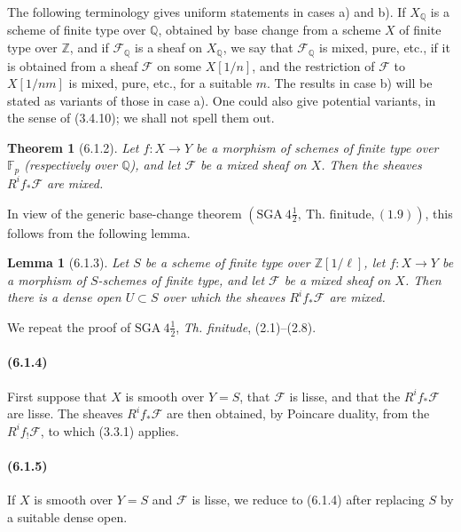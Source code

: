\documentclass[11pt]{article}
\newtheorem{theorem}{Theorem}
\newtheorem{lemma}{Lemma}
\theoremstyle{remark}
\newcommand{\ZZ}{\mathbb{Z}}
\newcommand{\QQ}{\mathbb{Q}}
\begin{document}
The following terminology gives uniform statements in cases a) and b).  If \(X_{\QQ}\) is a scheme of finite type over \(\QQ\), obtained by base change from a scheme \(X\) of finite type over \(\ZZ\), and if \(\mathcal F_{\QQ}\) is a sheaf on \(X_{\QQ}\), we say that \(\mathcal F_{\QQ}\) is mixed, pure, etc., if it is obtained from a sheaf \(\mathcal F\) on some \(X[1/n]\), and the restriction of \(\mathcal F\) to \(X[1/nm]\) is mixed, pure, etc., for a suitable \(m\).  The results in case b) will be stated as variants of those in case a).  One could also give potential variants, in the sense of (3.4.10); we shall not spell them out.

\begin{theorem}[6.1.2]
Let \(f:X\to Y\) be a morphism of schemes of finite type over \(\mathbb F_p\) (respectively over \(\QQ\)), and let \(\mathcal F\) be a mixed sheaf on \(X\).  Then the sheaves \(R^if_*\mathcal F\) are mixed.
\end{theorem}

In view of the generic base-change theorem \((\mathrm{SGA}\ 4\tfrac12,\ \text{Th. finitude}, (1.9))\), this follows from the following lemma.

\begin{lemma}[6.1.3]
Let \(S\) be a scheme of finite type over \(\ZZ[1/\ell]\), let \(f:X\to Y\) be a morphism of \(S\)-schemes of finite type, and let \(\mathcal F\) be a mixed sheaf on \(X\).  Then there is a dense open \(U\subset S\) over which the sheaves \(R^if_*\mathcal F\) are mixed.
\end{lemma}

We repeat the proof of \(\mathrm{SGA}\ 4\tfrac12\), \emph{Th. finitude}, (2.1)--(2.8).

\paragraph{(6.1.4)}
First suppose that \(X\) is smooth over \(Y=S\), that \(\mathcal F\) is lisse, and that the \(R^if_*\mathcal F\) are lisse.  The sheaves \(R^if_*\mathcal F\) are then obtained, by Poincare duality, from the \(R^if_!\mathcal F\), to which (3.3.1) applies.

\paragraph{(6.1.5)}
If \(X\) is smooth over \(Y=S\) and \(\mathcal F\) is lisse, we reduce to (6.1.4) after replacing \(S\) by a suitable dense open.
\end{document}
